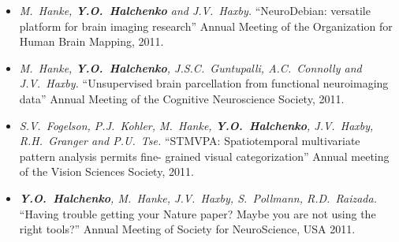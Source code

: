 \documentclass[12pt,overlapped,line]{res}
\newcommand{\mtitle}[1]{``#1''}
\newcommand{\mauthors}[1]{ \textit{#1.}}
\newcommand{\mwhere}[1]{#1.}
\begin{document}
\begin{resume}
\begin{itemize}
 \item
   \mauthors{M.~Hanke, \textbf{Y.O.~Halchenko} and J.V.~Haxby}
   \mtitle{NeuroDebian: versatile platform for brain imaging research}
   \mwhere{Annual Meeting of the Organization for Human Brain Mapping, 2011}

 \item
   \mauthors{M.~Hanke, \textbf{Y.O.~Halchenko}, J.S.C.~Guntupalli,
     A.C.~Connolly and J.V.~Haxby}
   \mtitle{Unsupervised brain parcellation from functional neuroimaging data}
   \mwhere{Annual Meeting of the Cognitive Neuroscience Society, 2011}

 \item
   \mauthors{S.V.~Fogelson, P.J.~Kohler, M.~Hanke, \textbf{Y.O.~Halchenko}, J.V.~Haxby,
     R.H.~Granger and P.U.~Tse}
   \mtitle{STMVPA: Spatiotemporal
     multivariate pattern analysis permits fine- grained visual
     categorization}
   \mwhere{Annual meeting of the Vision Sciences Society, 2011}

 \item
   \mauthors{\textbf{Y.O.~Halchenko}, M.~Hanke, J.V.~Haxby,
     S.~Pollmann, R.D.~Raizada}
   \mtitle{Having trouble getting your Nature paper? Maybe you are not
     using the right tools?}
   \mwhere{Annual Meeting of Society for NeuroScience, USA 2011}

% 
% 

\end{itemize}


\end{resume}
\end{document}
